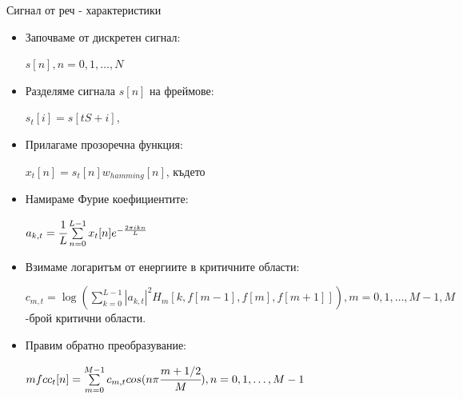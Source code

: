 \documentclass[9pt]{beamer}
\newcommand{\B}[1]{\left(#1\right)}
\begin{document}
        \begin{frame}[t]{Сигнал от реч - характеристики}
        \begin{itemize}
            \item Започваме от дискретен сигнал:
            
            $s[n], n = 0, 1, \ldots, N$
            \item Разделяме сигнала $s[n]$ на фреймове:
            
            $s_t[i] = s[tS + i]$,
        
            \item Прилагаме прозоречна функция:
            
            $x_t[n] = s_t[n]w_{hamming}[n]$, където
    
            \item Намираме Фурие коефициентите:
            
            $a_{k, t} = \cfrac{1}{L} \sum\limits_{n=0}^{L-1} x_t[n] e^{-\frac{2\pi i k n}{L}}$
            \item Взимаме логаритъм от енергиите в критичните области: 
            
            $c_{m, t} = \log\B{\sum\limits_{k = 0}^{L-1} |a_{k, t}|^2 H_{m}[k, f[m-1], f[m], f[m+1]]}, m = 0, 1, \ldots, M-1, M$-брой критични области.
           
            \item Правим обратно преобразувание:
    
            $mfcc_t[n] = \sum\limits_{m = 0}^{M-1} c_{m, t} cos(n\pi \cfrac{m+1/2}{M}), n = 0, 1, \ldots, M-1$
        \end{itemize}
    \end{frame}
\end{document}
